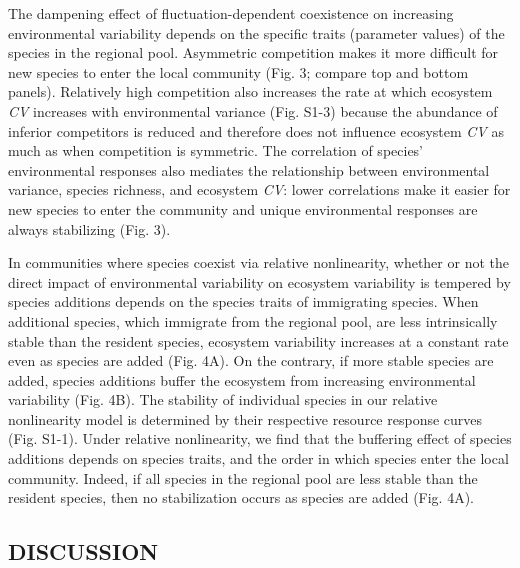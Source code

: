 \documentclass[12pt,]{article}
\begin{document}
The dampening effect of fluctuation-dependent coexistence on increasing
environmental variability depends on the specific traits (parameter
values) of the species in the regional pool. Asymmetric competition
makes it more difficult for new species to enter the local community
(Fig. 3; compare top and bottom panels). Relatively high competition
also increases the rate at which ecosystem \emph{CV} increases with
environmental variance (Fig. S1-3) because the abundance of inferior
competitors is reduced and therefore does not influence ecosystem
\emph{CV} as much as when competition is symmetric. The correlation of
species' environmental responses also mediates the relationship between
environmental variance, species richness, and ecosystem \emph{CV}: lower
correlations make it easier for new species to enter the community and
unique environmental responses are always stabilizing (Fig. 3).

In communities where species coexist via relative nonlinearity, whether
or not the direct impact of environmental variability on ecosystem
variability is tempered by species additions depends on the species
traits of immigrating species. When additional species, which immigrate
from the regional pool, are less intrinsically stable than the resident
species, ecosystem variability increases at a constant rate even as
species are added (Fig. 4A). On the contrary, if more stable species are
added, species additions buffer the ecosystem from increasing
environmental variability (Fig. 4B). The stability of individual species
in our relative nonlinearity model is determined by their respective
resource response curves (Fig. S1-1). Under relative nonlinearity, we
find that the buffering effect of species additions depends on species
traits, and the order in which species enter the local community.
Indeed, if all species in the regional pool are less stable than the
resident species, then no stabilization occurs as species are added
(Fig. 4A).

\subsection{DISCUSSION}\label{discussion}
\end{document}
